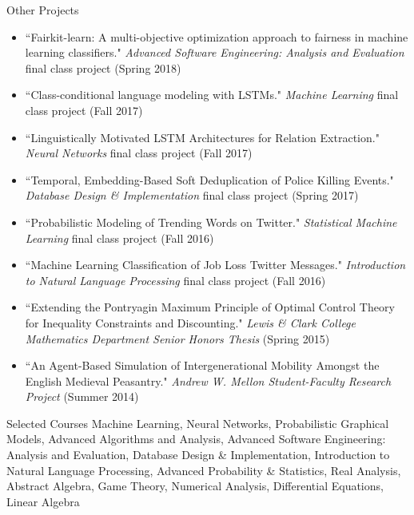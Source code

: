 \documentclass{resume} %
\begin{document}

\begin{rSection}{Other Projects}

\begin{itemize}
\item ``Fairkit-learn:  A multi-objective optimization approach to fairness in machine learning classifiers." \emph{Advanced Software Engineering: Analysis and Evaluation} final class project (Spring 2018)
\item ``Class-conditional language modeling with LSTMs." \emph{Machine Learning} final class project (Fall 2017)
\item ``Linguistically Motivated LSTM Architectures for Relation Extraction." \emph{Neural Networks} final class project (Fall 2017)  
\item ``Temporal, Embedding-Based Soft Deduplication of Police Killing Events." \emph{Database Design \& Implementation} final class project (Spring 2017) 
\item  ``Probabilistic Modeling of Trending Words on Twitter." \emph{Statistical Machine Learning} final class project (Fall 2016) 
\item ``Machine Learning Classification of Job Loss Twitter Messages." \emph{Introduction to Natural Language Processing} final class project (Fall 2016) 
\item ``Extending the Pontryagin Maximum Principle of Optimal Control Theory for Inequality Constraints and Discounting." \emph{Lewis \& Clark College Mathematics Department Senior Honors Thesis} (Spring 2015)
\item ``An Agent-Based Simulation of Intergenerational Mobility Amongst the English Medieval Peasantry." \emph{Andrew W. Mellon Student-Faculty Research Project} (Summer 2014) 
\end{itemize} 

\end{rSection}



\begin{rSection}{Selected Courses}
Machine Learning, Neural Networks, Probabilistic Graphical Models, Advanced Algorithms and Analysis, Advanced Software Engineering: Analysis and Evaluation, Database Design \& Implementation, Introduction to Natural Language Processing, Advanced Probability \& Statistics, Real Analysis, Abstract Algebra, Game Theory, Numerical Analysis, Differential Equations, Linear Algebra 
\end{rSection}
\end{document}
